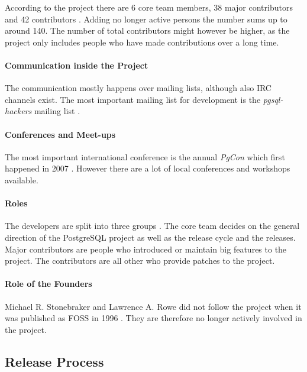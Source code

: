 According to the project there are 6 core team members, 38 major contributors
and 42 contributors \cite{PostgreSQLContributors}. Adding no longer active
persons the number sums up to around 140. The number of total contributors
might however be higher, as the project only includes people who have made
contributions over a long time.

\paragraph{Communication inside the Project}

The communication mostly happens over mailing lists, although also \ac{IRC}
channels exist. The most important mailing list for development is the
\emph{pgsql-hackers} mailing list \cite{PostgreSQLDevFAQ}.

\paragraph{Conferences and Meet-ups}

The most important international conference is the annual \emph{PgCon} which
first happened in 2007 \cite{PostgreSQLEvents}. However there are a lot of
local conferences and workshops available.

\paragraph{Roles}

The developers are split into three groups \cite{PostgreSQLContributors}. The
core team decides on the general direction of the PostgreSQL project as well as
the release cycle and the releases. Major contributors are people who
introduced or maintain big features to the project. The contributors are all
other who provide patches to the project.

\paragraph{Role of the Founders}

Michael R. Stonebraker and Lawrence A. Rowe did not follow the project when it
was published as \ac{FOSS} in 1996 \cite{PostgreSQLHistory}. They are therefore
no longer actively involved in the project.

\subsection{Release Process}

